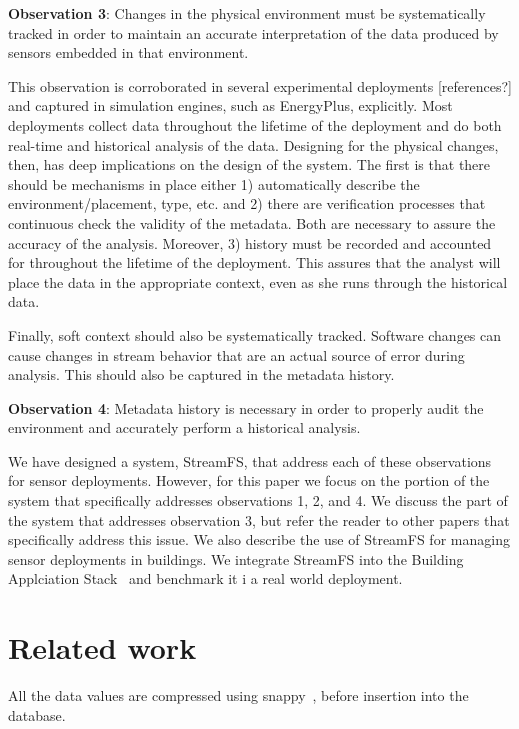 {\bf Observation 3}:  Changes in the physical environment must be systematically tracked in order to maintain an accurate 
interpretation of the data produced by sensors embedded in that environment.

This observation is corroborated in several experimental deployments [references?] and captured in simulation engines, 
such as EnergyPlus, explicitly.  Most deployments collect data throughout the lifetime of the deployment and do both real-time 
and historical analysis of the data.  Designing for the physical changes, then, has deep implications on the design of the system.  
The first is that there should be mechanisms in place either 1) automatically describe the environment/placement, type, etc. and 
2) there are verification processes that continuous check the validity of the metadata.  Both are necessary to assure the accuracy 
of the analysis.  Moreover, 3) history must be recorded and accounted for throughout the lifetime of the deployment.  This assures 
that the analyst will place the data in the appropriate context, even as she runs through the historical data.

Finally, soft context should also be systematically tracked.  Software changes can cause changes in stream behavior that are an 
actual source of error during analysis.  This should also be captured in the metadata history.

{\bf Observation 4}: Metadata history is necessary in order to properly audit the environment and accurately perform a historical 
analysis.

We have designed a system, StreamFS, that address each of these observations for sensor deployments.  However, for this paper we focus on
the portion of the system that specifically addresses observations 1, 2, and 4.  We discuss the part of the system that addresses
observation 3, but refer the reader to other papers that specifically address this issue.  We also describe the use of StreamFS for
managing sensor deployments in buildings.  We integrate StreamFS into the Building Applciation Stack~\cite{BAS} and benchmark it i
a real world deployment.

\section{Related work}

All the data values are compressed using snappy~\cite{snappy}, before insertion into the database.


